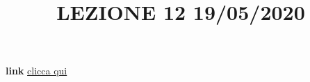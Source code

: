 \title{LEZIONE 12 19/05/2020}\newline
\textbf{link} \href{https://web.microsoftstream.com/video/4108da02-d3de-45e4-ab46-94d93c315e97}{clicca qui}